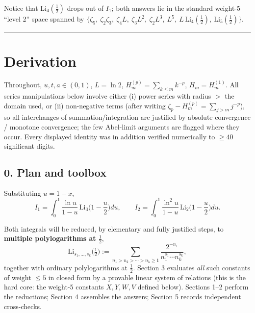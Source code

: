 \documentclass[11pt]{article}
\theoremstyle{remark}
\begin{document}
Notice that $\mathrm{Li}_4(\tfrac12)$ drops out of $I_1$; both answers lie in the standard weight-5 ``level 2'' space spanned by
$\{\zeta_5,\ \zeta_2\zeta_3,\ \zeta_4L,\ \zeta_3L^2,\ \zeta_2L^3,\ L^5,\ L\,\mathrm{Li}_4(\tfrac12),\ \mathrm{Li}_5(\tfrac12)\}$.

\begin{center}\rule{0.5\linewidth}{0.4pt}\end{center}

\section*{Derivation}

Throughout, $u,t,a\in(0,1)$, $L=\ln 2$, $H_m^{(p)}=\sum_{k\le m}k^{-p}$, $H_m=H_m^{(1)}$.
All series manipulations below involve either (i) power series with radius $>$ the domain used, or (ii) non-negative terms (after writing $\zeta_p-H_m^{(p)}=\sum_{j>m}j^{-p}$), so all interchanges of summation/integration are justified by absolute convergence / monotone convergence; the few Abel-limit arguments are flagged where they occur. Every displayed identity was in addition verified numerically to $\ge 40$ significant digits.

\subsection*{0. Plan and toolbox}

Substituting $u=1-x$,
\begin{equation*}
I_1=\int_0^1\frac{\ln u}{1-u}\,\mathrm{Li}_3\!\Big(1-\frac u2\Big)du,\qquad
I_2=\int_0^1\frac{\ln^2 u}{1-u}\,\mathrm{Li}_2\!\Big(1-\frac u2\Big)du. \tag{0.1}
\end{equation*}

Both integrals will be reduced, by elementary and fully justified steps, to \textbf{multiple polylogarithms at $\tfrac12$},
\[
\mathrm{Li}_{s_1,\dots,s_k}\!\Big(\tfrac12\Big):=\sum_{n_1>n_2>\cdots>n_k\ge1}\frac{2^{-n_1}}{n_1^{s_1}\cdots n_k^{s_k}},
\]
together with ordinary polylogarithms at $\tfrac12$. Section 3 evaluates \textit{all} such constants of weight $\le5$ in closed form by a provable linear system of relations (this is the hard core: the weight-5 constants $X,Y,W,V$ defined below). Sections 1--2 perform the reductions; Section 4 assembles the answers; Section 5 records independent cross-checks.
\end{document}
